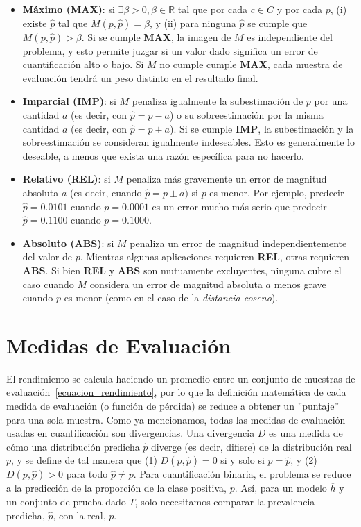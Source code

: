 \begin{itemize}
    \item {\bf Máximo (MAX)}: si $\exists \beta >0, \beta \in \mathbb{R}$ tal
    que por cada $c \in C$ y por cada $p$, (i) existe $\hat p$ tal que $M(p,
    \hat p) = \beta$, y (ii) para ninguna $\hat p$ se cumple que $M(p, \hat p) >
    \beta$. Si se cumple {\bf MAX}, la imagen de $M$ es independiente del
    problema, y esto permite juzgar si un valor dado significa un error de
    cuantificación alto o bajo. Si $M$ no cumple cumple {\bf MAX}, cada muestra
    de evaluación tendrá un peso distinto en el resultado final.
    \item {\bf Imparcial (IMP)}: si $M$ penaliza igualmente la subestimación de
    $p$ por una cantidad $a$ (es decir, con $\hat p = p - a$) o su
    sobreestimación por la misma cantidad $a$ (es decir, con $\hat p = p + a$).
    Si se cumple {\bf IMP}, la subestimación y la sobreestimación se consideran
    igualmente indeseables. Esto es generalmente lo deseable, a menos que exista
    una razón específica para no hacerlo.
    \item {\bf Relativo (REL)}: si $M$ penaliza más gravemente un error de
    magnitud absoluta $a$ (es decir, cuando $\hat p = p \pm a)$ si $p$ es menor.
    Por ejemplo, predecir $\hat p = 0.0101$ cuando $p = 0.0001$ es un error
    mucho más serio que predecir $\hat p = 0.1100$ cuando $p = 0.1000$.
    \item {\bf Absoluto (ABS)}: si $M$ penaliza un error de magnitud
    independientemente del valor de $p$. Mientras algunas aplicaciones requieren
    {\bf REL}, otras requieren {\bf ABS}. Si bien {\bf REL} y {\bf ABS} son
    mutuamente excluyentes, ninguna cubre el caso cuando $M$ considera un error
    de magnitud absoluta $a$ menos grave cuando $p$ es menor (como en el caso de
    la {\it distancia coseno\/}).
\end{itemize}

\section{Medidas de Evaluación}\label{evaluacion:medidas}

El rendimiento se calcula haciendo un promedio entre un conjunto de muestras de
evaluación~\ref{ecuacion_rendimiento}, por lo que la definición matemática de
cada medida de evaluación (o función de pérdida) se reduce a obtener un
''puntaje'' para una sola muestra. Como ya mencionamos, todas las medidas de
evaluación usadas en cuantificación son divergencias. Una divergencia $D$ es una
medida de cómo una distribución predicha $\hat{p}$ diverge (es decir, difiere)
de la distribución real $p$, y se define de tal manera que (1) $D(p, \hat{p}) =
0$ si y solo si $p = \hat{p}$, y (2) $D(p, \hat{p}) > 0$ para todo $\hat{p} \neq
p$. Para cuantificación binaria, el problema se reduce a la predicción de la
proporción de la clase positiva, $p$. Así, para un modelo $\overline{h}$ y un
conjunto de prueba dado $T$, solo necesitamos comparar la prevalencia predicha,
$\hat{p}$, con la real, $p$.

